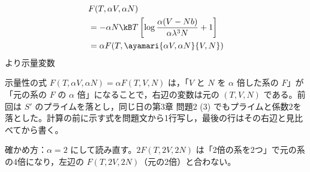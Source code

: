 \begin{align*}
&F(T,\alpha V,\alpha N)\\
&=-\alpha N\kB T\left[\log\frac{\alpha(V-Nb)}{\alpha\lambda^{3}N}+1\right]\\
&=\alpha F(T,\ayamari{\alpha V,\alpha N}{V,N})
\end{align*}
より示量変数
\item {} 示量性の式 $F(T,\alpha V,\alpha N)=\alpha F(T,V,N)$ は，「$V$ と $N$ を $\alpha$ 倍した系の $F$」が「元の系の $F$ の $\alpha$ 倍」になることで，右辺の変数は元の $(T,V,N)$ である。前回は $S'$ のプライムを落とし，同じ日の第3章 問題2 (3) でもプライムと係数2を落とした。計算の前に示す式を問題文から1行写し，最後の行はその右辺と見比べてから書く。
\item 確かめ方：$\alpha=2$ にして読み直す。$2F(T,2V,2N)$ は「2倍の系を2つ」で元の系の4倍になり，左辺の $F(T,2V,2N)$（元の2倍）と合わない。
